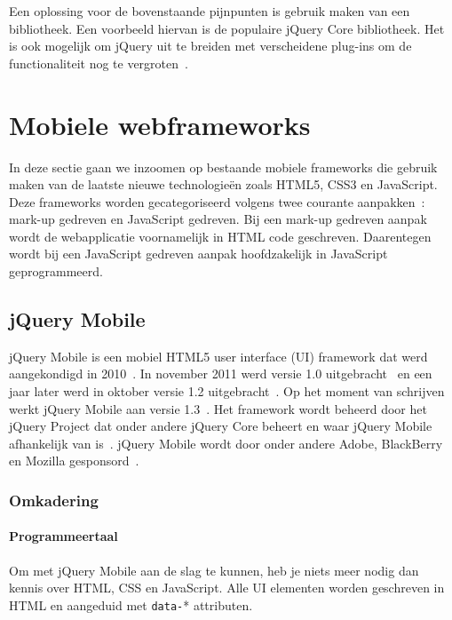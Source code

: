 Een oplossing voor de bovenstaande pijnpunten is gebruik maken van een bibliotheek. Een voorbeeld hiervan is de populaire jQuery Core bibliotheek. Het is ook mogelijk om jQuery  uit te breiden met verscheidene plug-ins om de functionaliteit nog te vergroten~\cite{McFarland2011}.


\section{Mobiele webframeworks}
\label{sec:mobiele-frameworks}
In deze sectie gaan we inzoomen op bestaande mobiele frameworks die gebruik maken van de laatste nieuwe technologieën zoals HTML5, CSS3 en JavaScript. Deze frameworks worden gecategoriseerd volgens twee courante aanpakken~\cite{Oeflman2011}: mark-up gedreven en JavaScript gedreven. Bij een mark-up gedreven aanpak wordt de webapplicatie voornamelijk in HTML code geschreven. Daarentegen wordt bij een JavaScript gedreven aanpak hoofdzakelijk in JavaScript geprogrammeerd.

\subsection{jQuery Mobile}
jQuery Mobile is een mobiel HTML5 user interface (UI) framework dat werd aangekondigd in 2010~\cite{Resig2010}. In november 2011 werd versie 1.0 uitgebracht~\cite{Parker2011} en een jaar later werd in oktober versie 1.2 uitgebracht~\cite{Parker2012}. Op het moment van schrijven werkt jQuery Mobile aan versie 1.3~\cite{Parker2012a}. Het framework wordt beheerd door het jQuery Project dat onder andere jQuery Core beheert en waar jQuery Mobile afhankelijk van is~\cite{JQuery2012}. jQuery Mobile wordt door onder andere Adobe, BlackBerry en Mozilla gesponsord~\cite{JQuery2012a}.

\subsubsection{Omkadering}
\paragraph{Programmeertaal}
Om met jQuery Mobile aan de slag te kunnen, heb je niets meer nodig dan kennis over HTML, CSS en JavaScript. Alle UI elementen worden geschreven in HTML en aangeduid met \texttt{data-}* attributen.

